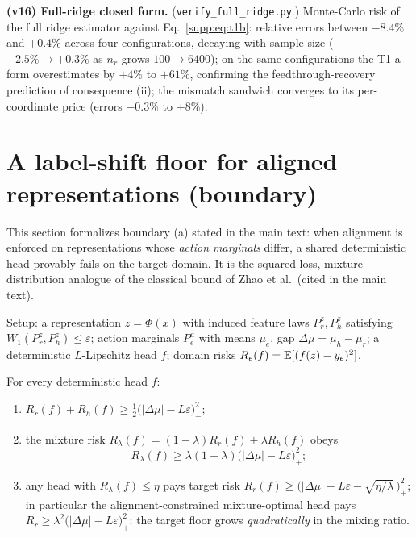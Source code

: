 \textbf{(v16) Full-ridge closed form.} (\texttt{verify\_full\_ridge.py}.) Monte-Carlo risk of the full ridge estimator against Eq.~\eqref{supp:eq:t1b}: relative errors between $-8.4\%$ and $+0.4\%$ across four configurations, decaying with sample size ($-2.5\% \to +0.3\%$ as $n_r$ grows $100 \to 6400$); on the same configurations the T1-a form overestimates by $+4\%$ to $+61\%$, confirming the feedthrough-recovery prediction of consequence (ii); the mismatch sandwich converges to its per-coordinate price (errors $-0.3\%$ to $+8\%$).

\section{A label-shift floor for aligned representations (boundary)}
\label{supp:zhao}

This section formalizes boundary (a) stated in the main text: when alignment is enforced on representations whose \emph{action marginals} differ, a shared deterministic head provably fails on the target domain.
It is the squared-loss, mixture-distribution analogue of the classical bound of Zhao et al.\ (cited in the main text).

Setup: a representation $z = \Phi(x)$ with induced feature laws $P_r^z, P_h^z$ satisfying $W_1(P_r^z, P_h^z) \le \varepsilon$; action marginals $P_e^a$ with means $\mu_e$, gap $\Delta\mu = \mu_h - \mu_r$; a deterministic $L$-Lipschitz head $f$; domain risks $R_e(f) = \mathbb{E}[(f(z) - y_e)^2]$.

\begin{proposition}\label{supp:prop:zhao}
For every deterministic head $f$:
\begin{enumerate}
\item[(i)] $R_r(f) + R_h(f) \ge \tfrac12\big(|\Delta\mu| - L\varepsilon\big)_+^2$;
\item[(ii)] the mixture risk $R_\lambda(f) = (1-\lambda)R_r(f) + \lambda R_h(f)$ obeys
\begin{equation}
R_\lambda(f) \ge \lambda(1-\lambda)\big(|\Delta\mu| - L\varepsilon\big)_+^2;
\end{equation}
\item[(iii)] any head with $R_\lambda(f) \le \eta$ pays target risk
$R_r(f) \ge \big(|\Delta\mu| - L\varepsilon - \sqrt{\eta/\lambda}\,\big)_+^2$;
in particular the alignment-constrained mixture-optimal head pays
$R_r \ge \lambda^2\big(|\Delta\mu| - L\varepsilon\big)_+^2$: the target floor grows \emph{quadratically} in the mixing ratio.
\end{enumerate}
\end{proposition}

